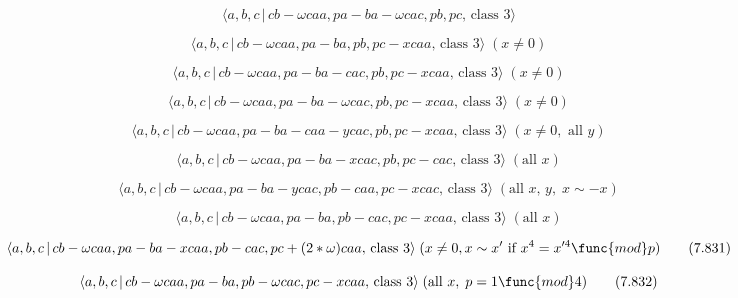 \documentclass[10pt]{article}
\begin{document}
\begin{equation}
\langle a,b,c\,|\,cb-\omega caa,pa-ba-\omega cac,pb,pc,\,\text{class }%
3\rangle  \tag{7.823}
\end{equation}

\begin{equation}
\langle a,b,c\,|\,cb-\omega caa,pa-ba,pb,pc-xcaa,\,\text{class }3\rangle
\;(x\neq 0)  \tag{7.824}
\end{equation}

\begin{equation}
\langle a,b,c\,|\,cb-\omega caa,pa-ba-cac,pb,pc-xcaa,\,\text{class }3\rangle
\;(x\neq 0)  \tag{7.825}
\end{equation}

\begin{equation}
\langle a,b,c\,|\,cb-\omega caa,pa-ba-\omega cac,pb,pc-xcaa,\,\text{class }%
3\rangle \;(x\neq 0)  \tag{7.826}
\end{equation}

\begin{equation}
\langle a,b,c\,|\,cb-\omega caa,pa-ba-caa-ycac,pb,pc-xcaa,\,\text{class }%
3\rangle \;(x\neq 0,\text{ all }y)  \tag{7.827}
\end{equation}

\begin{equation}
\langle a,b,c\,|\,cb-\omega caa,pa-ba-xcac,pb,pc-cac,\,\text{class }3\rangle
\;(\text{all }x)  \tag{7.828}
\end{equation}

\begin{equation}
\langle a,b,c\,|\,cb-\omega caa,pa-ba-ycac,pb-caa,pc-xcac,\,\text{class }%
3\rangle \;(\text{all }x,\,y,\;x\sim -x)  \tag{7.829}
\end{equation}

\begin{equation}
\langle a,b,c\,|\,cb-\omega caa,pa-ba,pb-cac,pc-xcaa,\,\text{class }3\rangle
\;(\text{all }x)  \tag{7.830}
\end{equation}

\begin{equation}
\langle a,b,c\,|\,cb-\omega caa,pa-ba-xcaa,pb-cac,pc+(2\ast \omega )caa,\,%
\text{class }3\rangle \;(x\neq 0,x\sim x^{\prime}\text{ if }x^4=x^{\prime 4}%
\func{mod}p)  \tag{7.831}
\end{equation}

\begin{equation}
\langle a,b,c\,|\,cb-\omega caa,pa-ba,pb-\omega cac,pc-xcaa,\,\text{class }%
3\rangle \;(\text{all }x,\;p=1\func{mod}4)  \tag{7.832}
\end{equation}
\end{document}
